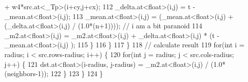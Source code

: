 \begin{DoxyCode}
       + w4*src.at<\_Tp>(i+cy,j+cx);
112                 \_delta.at<\textcolor{keywordtype}{float}>(i,j) = t - \_mean.at<\textcolor{keywordtype}{float}>(i,j);
113                 \_mean.at<\textcolor{keywordtype}{float}>(i,j) = (\_mean.at<\textcolor{keywordtype}{float}>(i,j) + (\_delta.at<\textcolor{keywordtype}{float}>(i,j) / (1.0*(n+1)))); \textcolor{comment}{// i
       am a bit paranoid}
114                 \_m2.at<\textcolor{keywordtype}{float}>(i,j) = \_m2.at<\textcolor{keywordtype}{float}>(i,j) + \_delta.at<\textcolor{keywordtype}{float}>(i,j) * (t - \_mean.at<\textcolor{keywordtype}{float}>(i,j)
      );
115             \}
116         \}
117     \}
118     \textcolor{comment}{// calculate result}
119     \textcolor{keywordflow}{for}(\textcolor{keywordtype}{int} i = radius; i < src.rows-radius; i++) \{
120         \textcolor{keywordflow}{for}(\textcolor{keywordtype}{int} j = radius; j < src.cols-radius; j++) \{
121             dst.at<\textcolor{keywordtype}{float}>(i-radius, j-radius) = \_m2.at<\textcolor{keywordtype}{float}>(i,j) / (1.0*(neighbors-1));
122         \}
123     \}
124 \}
\end{DoxyCode}
